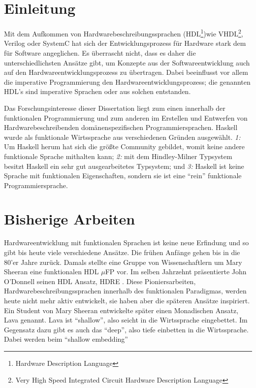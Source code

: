 \section{Einleitung}

Mit dem Aufkommen von Hardwarebeschreibungssprachen (HDL\footnote{Hardware Description Language})wie VHDL\footnote{Very High Speed
  Integrated Circuit Hardware Description Language}, Verilog oder SystemC hat sich der Entwicklungsprozess für Hardware stark dem
für Software angeglichen. Es überrascht nicht, dass es daher die unterschiedlichsten Ansätze gibt, um Konzepte aus der
Softwareentwicklung auch auf den Hardwareentwicklungsprozess zu übertragen. Dabei beeinflusst vor allem die imperative
Programmierung den Hardwareentwicklungsprozess; die genannten HDL's sind imperative Sprachen oder aus solchen entstanden.

Das Forschungsinteresse dieser Dissertation liegt zum einen innerhalb der funktionalen Programmierung und zum anderen im Erstellen
und Entwerfen von Hardwarebeschreibenden domänenspezifischen Programmiersprachen. Haskell wurde als funktionale Wirtssprache aus
verschiedenen Gründen ausgewählt. \emph{1:} Um Haskell herum hat sich die größte Community gebildet, womit keine andere
funktionale Sprache mithalten kann; \emph{2:} mit dem Hindley-Milner Typsystem besitzt Haskell ein sehr gut ausgearbeitetes
Typsystem; und \emph{3:} Haskell ist keine Sprache mit funktionalen Eigenschaften, sondern sie ist eine ``rein'' funktionale
Programmiersprache. 

\section{Bisherige Arbeiten}
Hardwareentwicklung mit funktionalen Sprachen ist keine neue Erfindung und so gibt bis heute viele verschiedene Ansätze. Die
frühen Anfänge gehen bis in die 80'er Jahre zurück. Damals stellte eine Gruppe von Wissenschaftlern um Mary Sheeran eine
funktionalen HDL $\mu$FP\cite{sheeran:muFP} vor. Im selben Jahrzehnt präsentierte John O'Donnell seinen HDL Ansatz,
HDRE\cite{hydra:old} \cite{donnell}. Diese Pioniersarbeiten, Hardwarebeschreibungssprachen innerhalb des funktionalen Paradigmas,
werden heute nicht mehr aktiv entwickelt, sie haben aber die späteren Ansätze inspiriert. Ein Student von Mary Sheeran entwickelte
später einen Monadischen Ansatz, Lava\cite{claessen:hardware} genannt. Lava ist ``shallow'', also seicht in die Wirtssprache
eingebettet. Im Gegensatz dazu gibt es auch das ``deep'', also tiefe einbetten in die Wirtssprache. Dabei werden beim ``shallow
embedding'' 



